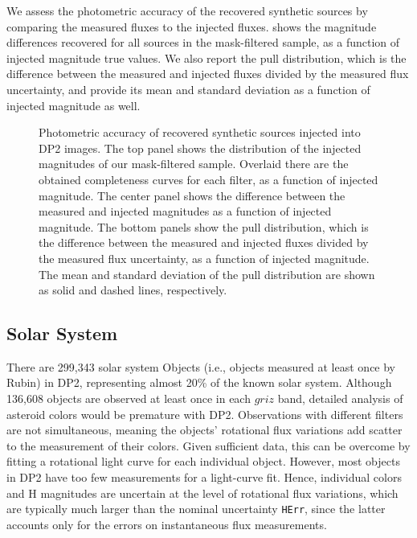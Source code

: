 We assess the photometric accuracy of the recovered synthetic sources by comparing the measured fluxes to the injected fluxes.
 shows the magnitude differences recovered for all sources in the mask-filtered sample, as a function of injected magnitude true values.
%
We also report the pull distribution, which is the difference between the measured and injected fluxes divided by the measured \gls{flux} uncertainty, and provide its mean and standard deviation as a function of injected magnitude as well.
%
\begin{figure}[htbp]
\caption{Photometric accuracy of recovered synthetic sources injected into \gls{DP2} images. The top panel shows the distribution of the injected magnitudes of our mask-filtered sample.
%
Overlaid there are the obtained completeness curves for each filter, as a function of injected magnitude.
%
The center panel shows the difference between the measured and injected magnitudes as a function of injected magnitude.
The bottom panels show the pull distribution, which is the difference between the measured and injected fluxes divided by the measured \gls{flux} uncertainty, as a function of injected magnitude.
The mean and standard deviation of the pull distribution are shown as solid and dashed lines, respectively.
}
\label{fig:dp2_dia_fakes_photometry}
\end{figure}

\subsection{Solar System}\label{sec:drp-variabletransient-solar-association}
There are 299,343 solar system Objects (i.e., objects measured at least once by Rubin) in \gls{DP2}, representing almost 20\% of the known solar system.
Although 136,608 objects are observed at least once in each $griz$ band, detailed analysis of asteroid colors would be premature with \gls{DP2}.
Observations with different filters are not simultaneous, meaning the objects' rotational \gls{flux} variations add scatter to the measurement of their colors.
Given sufficient data, this can be overcome by fitting a rotational light curve for each individual object.
However, most objects in \gls{DP2} have too few measurements for a light-curve fit.
Hence, individual colors and H magnitudes are uncertain at the level of rotational \gls{flux} variations, which are typically much larger than the nominal uncertainty \texttt{HErr}, since the latter accounts only for the errors on instantaneous \gls{flux} measurements.

